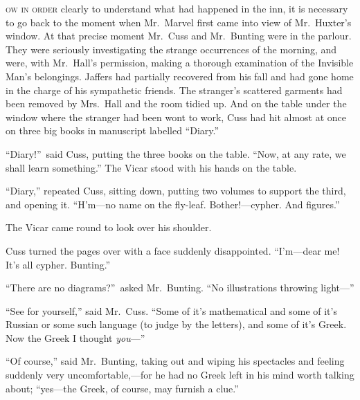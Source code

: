 \label{ch:11}
\begin{ChapterStart}
\vspace*{2\nbs}

\vspace{1.5\nbs}
\vspace{0.75\nbs}
\end{ChapterStart}

\kern-5pt\textsc{ow in order} clearly to understand what had happened in the inn, it is necessary to go back to the moment when Mr.\ Marvel first came into view of Mr.\ Huxter’s window. At that precise moment Mr.\ Cuss and Mr.\ Bunting were in the parlour. They were seriously investigating the strange occurrences of the morning, and were, with Mr.\ Hall’s permission, making a thorough examination of the Invisible Man’s belongings. Jaffers had partially recovered from his fall and had gone home in the charge of his sympathetic friends. The stranger’s scattered garments had been removed by Mrs.\ Hall and the room tidied up. And on the table under the window where the stranger had been wont to work, Cuss had hit almost at once on three big books in manuscript labelled “Diary.”

“Diary!”\ said Cuss, putting the three books on the table. “Now, at any rate, we shall learn something.” The Vicar stood with his hands on the table.

“Diary,” repeated Cuss, sitting down, putting two volumes to support the third, and opening it. “H’m—no name on the fly-leaf. Bother!—cypher. And figures.”

The Vicar came round to look over his shoulder.

Cuss turned the pages over with a face suddenly disappointed. “I’m—dear me! It’s all cypher. Bunting.”

“There are no diagrams?”\ asked Mr.\ Bunting. “No illustrations throwing light—”

“See for yourself,” said Mr.\ Cuss. “Some of it’s mathematical and some of it’s Russian or some such language (to judge by the letters), and some of it’s Greek. Now the Greek I thought \emph{you}—”

“Of course,” said Mr.\ Bunting, taking out and wiping his spectacles and feeling suddenly very uncomfortable,—for he had no Greek left in his mind worth talking about; “yes—the Greek, of course, may furnish a clue.”

